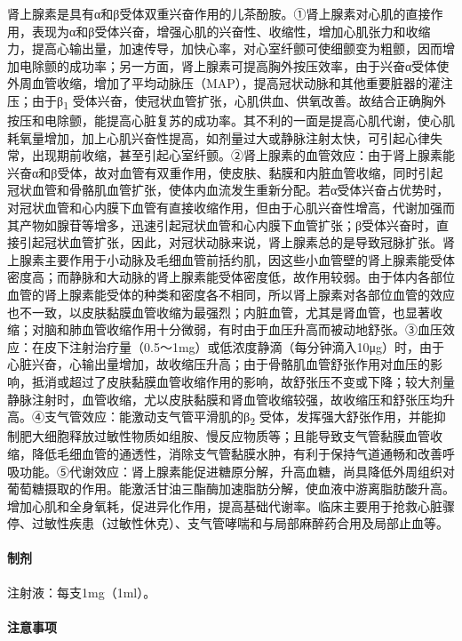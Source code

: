 肾上腺素是具有α和β受体双重兴奋作用的儿茶酚胺。①肾上腺素对心肌的直接作用，表现为α和β受体兴奋，增强心肌的兴奋性、收缩性，增加心肌张力和收缩力，提高心输出量，加速传导，加快心率，对心室纤颤可使细颤变为粗颤，因而增加电除颤的成功率；另一方面，肾上腺素可提高胸外按压效率，由于兴奋α受体使外周血管收缩，增加了平均动脉压（MAP），提高冠状动脉和其他重要脏器的灌注压；由于β\textsubscript{1}
受体兴奋，使冠状血管扩张，心肌供血、供氧改善。故结合正确胸外按压和电除颤，能提高心脏复苏的成功率。其不利的一面是提高心肌代谢，使心肌耗氧量增加，加上心肌兴奋性提高，如剂量过大或静脉注射太快，可引起心律失常，出现期前收缩，甚至引起心室纤颤。②肾上腺素的血管效应：由于肾上腺素能兴奋α和β受体，故对血管有双重作用，使皮肤、黏膜和内脏血管收缩，同时引起冠状血管和骨骼肌血管扩张，使体内血流发生重新分配。若α受体兴奋占优势时，对冠状血管和心内膜下血管有直接收缩作用，但由于心肌兴奋性增高，代谢加强而其产物如腺苷等增多，迅速引起冠状血管和心内膜下血管扩张；β受体兴奋时，直接引起冠状血管扩张，因此，对冠状动脉来说，肾上腺素总的是导致冠脉扩张。肾上腺素主要作用于小动脉及毛细血管前括约肌，因这些小血管壁的肾上腺素能受体密度高；而静脉和大动脉的肾上腺素能受体密度低，故作用较弱。由于体内各部位血管的肾上腺素能受体的种类和密度各不相同，所以肾上腺素对各部位血管的效应也不一致，以皮肤黏膜血管收缩为最强烈；内脏血管，尤其是肾血管，也显著收缩；对脑和肺血管收缩作用十分微弱，有时由于血压升高而被动地舒张。③血压效应：在皮下注射治疗量（0.5～1mg）或低浓度静滴（每分钟滴入10μg）时，由于心脏兴奋，心输出量增加，故收缩压升高；由于骨骼肌血管舒张作用对血压的影响，抵消或超过了皮肤黏膜血管收缩作用的影响，故舒张压不变或下降；较大剂量静脉注射时，血管收缩，尤以皮肤黏膜和肾血管收缩较强，故收缩压和舒张压均升高。④支气管效应：能激动支气管平滑肌的β\textsubscript{2}
受体，发挥强大舒张作用，并能抑制肥大细胞释放过敏性物质如组胺、慢反应物质等；且能导致支气管黏膜血管收缩，降低毛细血管的通透性，消除支气管黏膜水肿，有利于保持气道通畅和改善呼吸功能。⑤代谢效应：肾上腺素能促进糖原分解，升高血糖，尚具降低外周组织对葡萄糖摄取的作用。能激活甘油三酯酶加速脂肪分解，使血液中游离脂肪酸升高。增加心肌和全身氧耗，促进异化作用，提高基础代谢率。临床主要用于抢救心脏骤停、过敏性疾患（过敏性休克）、支气管哮喘和与局部麻醉药合用及局部止血等。

\paragraph{制剂}

注射液：每支1mg（1ml）。

\paragraph{注意事项}


